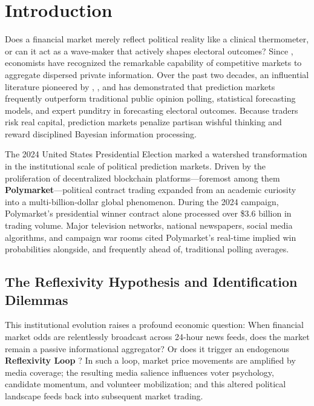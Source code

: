 \documentclass[12pt, a4paper]{article}
\begin{document}
\newpage
\tableofcontents
\newpage

\section{Introduction}
\label{sec:intro}

Does a financial market merely reflect political reality like a clinical thermometer, or can it act as a wave-maker that actively shapes electoral outcomes? Since \citet{Hayek1945}, economists have recognized the remarkable capability of competitive markets to aggregate dispersed private information. Over the past two decades, an influential literature pioneered by \citet{WolfersZitzewitz2004}, \citet{Arrow2008}, and \citet{Snowberg2007} has demonstrated that prediction markets frequently outperform traditional public opinion polling, statistical forecasting models, and expert punditry in forecasting electoral outcomes. Because traders risk real capital, prediction markets penalize partisan wishful thinking and reward disciplined Bayesian information processing.

The 2024 United States Presidential Election marked a watershed transformation in the institutional scale of political prediction markets. Driven by the proliferation of decentralized blockchain platforms---foremost among them \textbf{Polymarket}---political contract trading expanded from an academic curiosity into a multi-billion-dollar global phenomenon. During the 2024 campaign, Polymarket's presidential winner contract alone processed over \$3.6 billion in trading volume. Major television networks, national newspapers, social media algorithms, and campaign war rooms cited Polymarket's real-time implied win probabilities alongside, and frequently ahead of, traditional polling averages.

\subsection{The Reflexivity Hypothesis and Identification Dilemmas}
This institutional evolution raises a profound economic question: When financial market odds are relentlessly broadcast across 24-hour news feeds, does the market remain a passive informational aggregator? Or does it trigger an endogenous \textbf{Reflexivity Loop} \citep{Soros1987}? In such a loop, market price movements are amplified by media coverage; the resulting media salience influences voter psychology, candidate momentum, and volunteer mobilization; and this altered political landscape feeds back into subsequent market trading.
\end{document}
